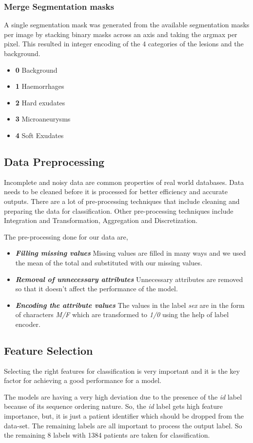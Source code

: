 \documentclass[conference]{IEEEtran}
\begin{document}
\subsubsection{Merge Segmentation masks}
\label{sssec:merge}

A single segmentation mask was generated from the available segmentation masks per image by stacking binary masks across an axis and taking the argmax per pixel. This resulted in integer encoding of the 4 categories of the lesions and the background.
\begin{itemize}
		\item \textbf{0} Background
		\item \textbf{1} Haemorrhages
		\item \textbf{2} Hard exudates
		\item \textbf{3} Microaneurysms 
  		\item \textbf{4} Soft Exudates
\end{itemize} 

\subsection{Data Preprocessing}
\label{ssec:preprocess}
Incomplete and noisy data are common properties of real world databases. Data needs to be cleaned before it is processed for better efficiency and accurate outputs. There are a lot of pre-processing techniques that include cleaning and preparing the data for classification. Other pre-processing techniques include Integration and Transformation, Aggregation and Discretization.

The pre-processing done for our data are,
\begin{itemize}
\item \textbf{\textit{Filling missing values}} Missing values are filled in many ways and we used the mean of the total and substituted with our missing values. 
\item \textbf{\textit{Removal of unnecessary attributes}} Unnecessary attributes are removed so that it doesn't affect the performance of the model.
\item \textbf{\textit{Encoding the attribute values}} The values in the label \textit{sex} are in the form of characters \textit{M/F} which are transformed to \textit{1/0} using the help of label encoder.
\end{itemize} 

\subsection{Feature Selection}
\label{ssec:featureselect}
Selecting the right features for classification is very important and it  is the key factor for achieving a good performance for a model. 
\par
The models are having a very high deviation due to the presence of the \textit{id} label because of its sequence ordering nature. So, the \textit{id} label gets high feature importance, but, it is just a patient identifier which should be dropped from the data-set. The remaining labels are all important to process the output label. So the remaining 8 labels with 1384 patients are taken for classification. 
\end{document}
